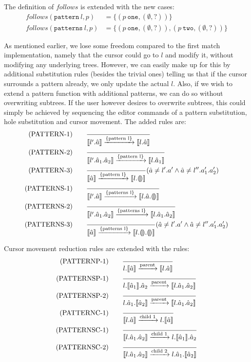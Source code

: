 \documentclass[10pt,a4paper,english]{article}
\begin{document}
The definition of $follows$ is extended with the new cases:
\begin{align}
  follows(\texttt{pattern}~l, p) &= \{ (p~\texttt{one}, (\emptyset, ?)) \}\\
follows(\texttt{patterns}~l, p) &= \{ (p~\texttt{one}, (\emptyset, ?)), (p~\texttt{two}, (\emptyset, ?)) \}
\end{align}

As mentioned earlier, we lose some freedom compared to the first match implementation, namely that the cursor could go to $l$ and modify it, without modifying any underlying trees. However, we can easily make up for this by additional substitution rules (besides the trivial ones) telling us that if the cursor surrounds a pattern already, we only update the actual $l$. Also, if we wish to extend a pattern function with additional patterns, we can do so without overwriting subtrees. If the user however desires to overwrite subtrees, this could simply be achieved by sequencing the editor commands of a pattern substitution, hole substitution and cursor movement. The added rules are:
\begin{align}
(\text{PATTERN-1})\qquad
&\frac{}{\llbracket l'.\hat{a} \rrbracket\xrightarrow[]{\text{\{pattern l\}}}\llbracket l.\hat{a} \rrbracket}\\
(\text{PATTERN-2})\qquad
&\frac{}{\llbracket l'.\hat{a}_1.\hat{a}_2 \rrbracket\xrightarrow[]{\text{\{pattern l\}}}\llbracket l.\hat{a}_1 \rrbracket}\\
(\text{PATTERN-3})\qquad
&\frac{}{\llbracket \hat{a} \rrbracket\xrightarrow[]{\text{\{pattern l\}}}\llbracket l.\llparenthesis\rrparenthesis \rrbracket}(\hat{a}\neq l'.a' \land \hat{a}\neq l''.a_1'.a_2')\\
(\text{PATTERNS-1})\qquad
&\frac{}{\llbracket l'.\hat{a} \rrbracket\xrightarrow[]{\text{\{patterns l\}}}\llbracket l.\hat{a}.\llparenthesis\rrparenthesis \rrbracket}\\
(\text{PATTERNS-2})\qquad
&\frac{}{\llbracket l'.\hat{a}_1.\hat{a}_2 \rrbracket\xrightarrow[]{\text{\{patterns l\}}}\llbracket l.\hat{a}_1.\hat{a}_2 \rrbracket}\\
(\text{PATTERNS-3})\qquad
&\frac{}{\llbracket \hat{a} \rrbracket\xrightarrow[]{\text{\{patterns l\}}}\llbracket l.\llparenthesis\rrparenthesis.\llparenthesis\rrparenthesis \rrbracket}(\hat{a}\neq l'.a' \land \hat{a}\neq l''.a_1'.a_2')
\end{align}

Cursor movement reduction rules are extended with the rules:
\begin{align}
  (\text{PATTERNP-1}) \qquad &\frac{}{l.\llbracket \hat{a} \rrbracket\xrightarrow[]{\text{parent}}\llbracket l.\hat{a} \rrbracket}\\
  (\text{PATTERNSP-1}) \qquad &\frac{}{l.\llbracket \hat{a}_1 \rrbracket.\hat{a}_2\xrightarrow[]{\text{parent}}\llbracket l.\hat{a}_1.\hat{a}_2 \rrbracket}\\
  (\text{PATTERNSP-2}) \qquad &\frac{}{l.\hat{a}_1.\llbracket \hat{a}_2 \rrbracket\xrightarrow[]{\text{parent}}\llbracket l.\hat{a}_1.\hat{a}_2 \rrbracket}\\
  (\text{PATTERNC-1}) \qquad &\frac{}{\llbracket l.\hat{a} \rrbracket\xrightarrow[]{\text{child 1}}l.\llbracket \hat{a} \rrbracket}\\
(\text{PATTERNSC-1}) \qquad &\frac{}{\llbracket l.\hat{a}_1.\hat{a}_2 \rrbracket\xrightarrow[]{\text{child 1}}l.\llbracket \hat{a}_1 \rrbracket.\hat{a}_2}\\
  (\text{PATTERNSC-2}) \qquad &\frac{}{\llbracket l.\hat{a}_1.\hat{a}_2 \rrbracket\xrightarrow[]{\text{child 2}}l.\hat{a}_1.\llbracket \hat{a}_2 \rrbracket}\\
\end{align}
\end{document}
